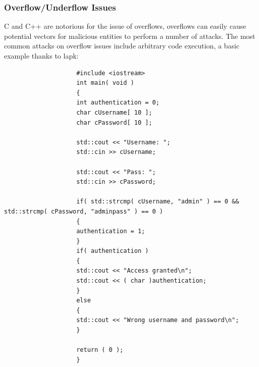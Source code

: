 \documentclass{IEEEtran}
\begin{document}
            \subsubsection{Overflow/Underflow Issues}
                C and C++ are notorious for the issue of overflows, overflows can easily 
                cause potential vectors for malicious entities to perform a number of 
                attacks.
                The most common attacks on overflow issues include arbitrary code execution,
                a basic example thanks to lapk\cite{lapk}:

                \lstset{style=cplusplus}
                \begin{lstlisting}
                    #include <iostream>
                    int main( void )
                    {
                    int authentication = 0;
                    char cUsername[ 10 ];
                    char cPassword[ 10 ];

                    std::cout << "Username: ";
                    std::cin >> cUsername;

                    std::cout << "Pass: ";
                    std::cin >> cPassword;

                    if( std::strcmp( cUsername, "admin" ) == 0 && std::strcmp( cPassword, "adminpass" ) == 0 )
                    {
                    authentication = 1;
                    }
                    if( authentication )
                    {
                    std::cout << "Access granted\n";
                    std::cout << ( char )authentication;
                    }
                    else
                    {
                    std::cout << "Wrong username and password\n";
                    }

                    return ( 0 );
                    }
                \end{lstlisting}
\end{document}
